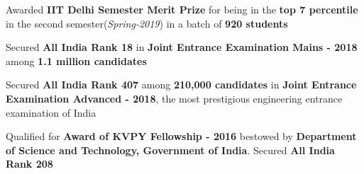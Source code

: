 
\begin{cventries}
    \cventry{}{}{}{}
    {
        \vspace{-5.0mm}
        \begin{cvitems}
            \item{Awarded \textbf{IIT Delhi Semester Merit Prize} for being in the \textbf{top 7 percentile} in the second semester(\textit{Spring-2019}) in a batch of \textbf{920 students}}
            \vspace{5pt}
            \item{Secured \textbf{All India Rank 18} in \textbf{Joint Entrance Examination Mains - 2018} among \textbf{1.1 million candidates}}
            \vspace{5pt}
            \item{Secured \textbf{All India Rank 407} among \textbf{210,000 candidates} in \textbf{Joint Entrance Examination Advanced - 2018},  the most prestigious engineering entrance examination of India}
            \vspace{5pt}
            \item{Qualified for \textbf{Award of KVPY Fellowship - 2016} bestowed by \textbf{Department of Science and Technology,
    Government of India}. \newline Secured \textbf{All India Rank 208}}
        \end{cvitems}
    }
\end{cventries}